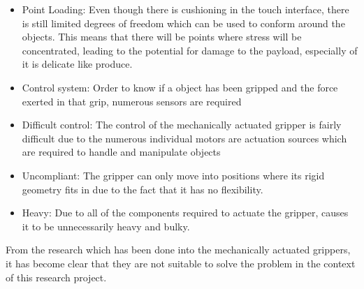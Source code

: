 \documentclass[11pt]{article}
\begin{document}
\begin{itemize}
\item Point Loading: Even though there is cushioning in the touch interface, there is still limited degrees of freedom which can be used to conform around the objects. This means that there will be points where stress will be concentrated, leading to the potential for damage to the payload, especially of it is delicate like produce.
\item Control system: Order to know if a object has been gripped and the force exerted in that grip, numerous sensors are required \cite{chiu2013development}
\item Difficult control: The control of the mechanically actuated gripper is fairly difficult due to the numerous individual motors are actuation sources which are required to handle and manipulate objects \cite{marchese2015recipe}
\item Uncompliant: The gripper can only move into positions where its rigid geometry fits in due to the  fact that it has no flexibility.
\item Heavy: Due to all of the components required to actuate the gripper, causes it to be unnecessarily heavy and bulky.
\end{itemize}
From the research which has been done into the mechanically actuated grippers, it has become clear that they are not suitable to solve the  problem in the context of this research project. 
\end{document}
